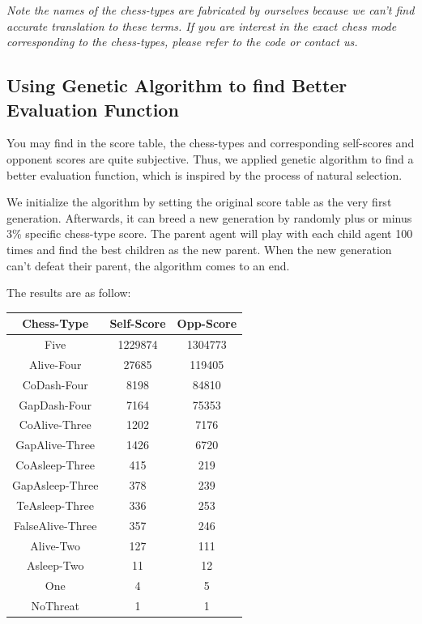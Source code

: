 \documentclass[12pt,a4paper]{article}
\begin{document}
\noindent\begin{small}\emph{Note the names of the chess-types are fabricated by ourselves because we can't find accurate translation to these terms. If you are interest in the exact chess mode corresponding to the chess-types, please refer to the code or contact us.}\end{small}

\subsection{Using Genetic Algorithm to find Better Evaluation Function}
You may find in the score table, the chess-types and corresponding self-scores and opponent scores are quite subjective. Thus, we applied genetic algorithm to find a better evaluation function, which is inspired by the process of natural selection.

We initialize the algorithm by setting the original score table as the very first generation. Afterwards, it can breed a new generation by randomly plus or minus 3\% specific chess-type score. The parent agent will play with each child agent 100 times and find the best children as the new parent. When the new generation can't defeat their parent, the algorithm comes to an end.

The results are as follow:
\begin{table}[h]
\centering
\begin{tabular}{c|c|c}
\hline
Chess-Type&Self-Score&Opp-Score  \\
\hline
Five&1229874&1304773\\
Alive-Four&27685&119405\\
CoDash-Four&8198&84810\\
GapDash-Four&7164&75353\\
CoAlive-Three&1202&7176\\
GapAlive-Three&1426&6720\\
CoAsleep-Three&415&219\\
GapAsleep-Three&378&239\\
TeAsleep-Three&336&253\\
FalseAlive-Three&357&246\\
Alive-Two&127&111\\
Asleep-Two&11&12\\
One&4&5\\
NoThreat&1&1\\
\hline
\end{tabular}
\end{table}
\end{document}
